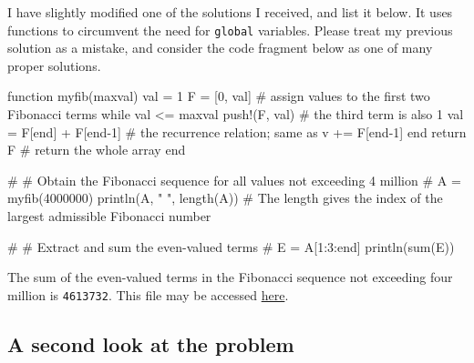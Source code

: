 \documentclass[
  a4paper,
]{article}
\newenvironment{Shaded}{\begin{snugshade}}{\end{snugshade}}
\newcommand{\CommentTok}[1]{\textcolor[rgb]{0.50,0.62,0.50}{#1}}
\newcommand{\ControlFlowTok}[1]{\textcolor[rgb]{0.94,0.87,0.69}{#1}}
\newcommand{\FloatTok}[1]{\textcolor[rgb]{0.75,0.75,0.82}{#1}}
\newcommand{\FunctionTok}[1]{\textcolor[rgb]{0.94,0.94,0.56}{#1}}
\newcommand{\KeywordTok}[1]{\textcolor[rgb]{0.94,0.87,0.69}{#1}}
\newcommand{\NormalTok}[1]{\textcolor[rgb]{0.80,0.80,0.80}{#1}}
\newcommand{\OperatorTok}[1]{\textcolor[rgb]{0.94,0.94,0.82}{#1}}
\newcommand{\StringTok}[1]{\textcolor[rgb]{0.80,0.58,0.58}{#1}}
\begin{document}
I have slightly modified one of the solutions I received, and list it
below. It uses functions to circumvent the need for \texttt{global}
variables. Please treat my previous solution as a mistake, and consider
the code fragment below as one of many proper solutions.

\begin{Shaded}
\begin{Highlighting}[]
\KeywordTok{function} \FunctionTok{myfib}\NormalTok{(maxval)}
\NormalTok{    val }\OperatorTok{=} \FloatTok{1}
\NormalTok{    F }\OperatorTok{=}\NormalTok{ [}\FloatTok{0}\NormalTok{, val] }\CommentTok{\# assign values to the first two Fibonacci terms}
    \ControlFlowTok{while}\NormalTok{ val }\OperatorTok{\textless{}=}\NormalTok{ maxval}
        \FunctionTok{push!}\NormalTok{(F, val) }\CommentTok{\# the third term is also 1}
\NormalTok{        val }\OperatorTok{=}\NormalTok{ F[}\KeywordTok{end}\NormalTok{] }\OperatorTok{+}\NormalTok{ F[}\KeywordTok{end}\OperatorTok{{-}}\FloatTok{1}\NormalTok{] }\CommentTok{\# the recurrence relation; same as v += F[end{-}1]}
    \ControlFlowTok{end}
    \ControlFlowTok{return}\NormalTok{ F }\CommentTok{\# return the whole array}
\KeywordTok{end}

\CommentTok{\#}
\CommentTok{\# Obtain the Fibonacci sequence for all values not exceeding 4 million}
\CommentTok{\#}
\NormalTok{A }\OperatorTok{=} \FunctionTok{myfib}\NormalTok{(}\FloatTok{4000000}\NormalTok{)}
\FunctionTok{println}\NormalTok{(A, }\StringTok{" "}\NormalTok{, }\FunctionTok{length}\NormalTok{(A)) }\CommentTok{\# The length gives the index of the largest admissible Fibonacci number}

\CommentTok{\#}
\CommentTok{\# Extract and sum the even{-}valued terms}
\CommentTok{\#}
\NormalTok{E }\OperatorTok{=}\NormalTok{ A[}\FloatTok{1}\OperatorTok{:}\FloatTok{3}\OperatorTok{:}\KeywordTok{end}\NormalTok{]}
\FunctionTok{println}\NormalTok{(}\FunctionTok{sum}\NormalTok{(E))}
\end{Highlighting}
\end{Shaded}

The sum of the even-valued terms in the Fibonacci sequence not exceeding
four million is \texttt{4613732}. This file may be accessed
\href{auxiliary/even-f-sum.jl}{here}.

\hypertarget{a-second-look-at-the-problem}{%
\subsection{A second look at the
problem}\label{a-second-look-at-the-problem}}
\end{document}
